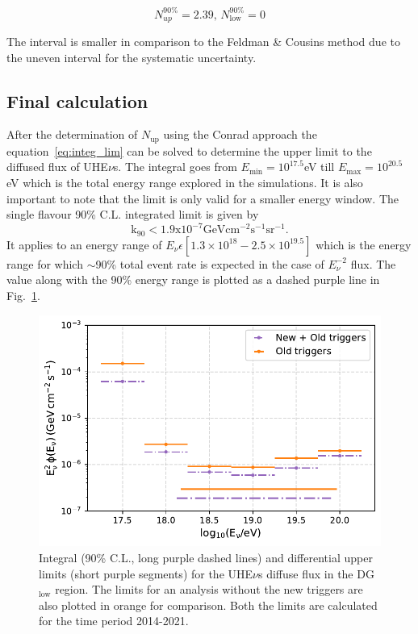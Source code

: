 \begin{equation}
  \label{eq:Conrad_lim}
  N^{90\%}_{up} = 2.39, \,N^{90\%}_{\text{low}} = 0
\end{equation}

The interval is smaller in comparison to the Feldman \& Cousins method due to the uneven interval for the systematic uncertainty. 

\subsection{Final calculation}
\label{subsec:final_lim}
After the determination of $N_{\text{up}}$ using the Conrad approach the equation~\ref{eq:integ_lim} can be solved to determine the upper limit to the diffused flux of UHE$\nu$s. The integral goes from $E_{\text{min}} = 10^{17.5} $eV till $E_{\text{max}} = 10^{20.5} $eV which is the total energy range explored in the simulations. It is also important to note that the limit is only valid for a smaller energy window. The single flavour 90\% C.L. integrated limit is given by 
\begin{equation}
  \label{eq:final_lim} 
  \mathrm{k_{90} < 1.9 x 10^{-7} GeV cm^{-2} s^{-1} sr^{-1}}.
\end{equation}
It applies to an energy range of $E_{\nu} \epsilon [1.3 \times 10^{18} - 2.5 \times 10^{19.5}]$ which is the energy range for which $\sim$90\% total event rate is expected in the case of $E^{-2}_{\nu}$ flux. The value along with the 90\% energy range is plotted as a dashed purple line in Fig.~\ref{fig:Limit_comp_1}.

\begin{figure}[t!]
  \centering
  \includegraphics[width=14.5cm]{thesis_figures/ExpLimits/Integ_DiffLimit_comp_new_sim_optim.pdf}
  \caption{Integral (90\% C.L., long purple dashed lines) and differential upper limits (short purple segments) for the UHE$\nu$s diffuse flux in the DG$\mathrm{_{\text{low}}}$ region. The limits for an analysis without the new triggers are also plotted in orange for comparison. Both the limits are calculated for the time period 2014-2021.}
  \label{fig:Limit_comp_1}
\end{figure}

